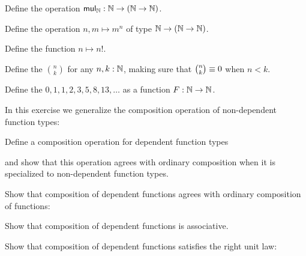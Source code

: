 \begin{exercises}
\begin{subexenum}
  \item Define the  operation $\mathsf{mul}_\N :\N\to(\N\to\N)$.
  \item Define the  operation $n,m\mapsto m^n$ of type $\N\to (\N\to \N)$.
  \item Define the  function $n\mapsto n!$.
  \item Define the  $\binom{n}{k}$ for any $n,k:\N$, making sure that $\binom{n}{k}\jdeq 0$ when $n<k$.
  \item Define the  $0,1,1,2,3,5,8,13,\ldots$ as a function $F:\N\to\N$.
  \end{subexenum}
\item In this exercise we generalize the composition operation of non-dependent function types:
\begin{subexenum}
\item Define a composition operation for dependent function types
\begin{prooftree}
\end{prooftree}
and show that this operation agrees with ordinary composition when it is specialized to non-dependent function types.
\item Show that composition of dependent functions agrees with ordinary composition of functions:
  \begin{prooftree}
  \end{prooftree}
\item Show that composition of dependent functions is associative.
\item Show that composition of dependent functions satisfies the right unit law:
\begin{prooftree}

\end{prooftree}
\end{subexenum}
\end{exercises}
